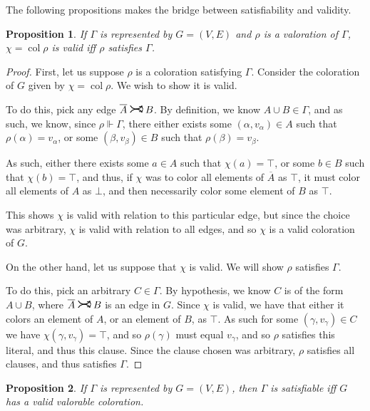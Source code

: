 \documentclass[11pt]{article}
\newcommand{\conj}[1]{\overline{#1}}
\newcommand{\sat}{\Vdash}
\DeclareMathOperator{\col}{col}
\newcommand{\rightcurvearrow}{
\mathrel{
  \begin{tikzpicture}[scale=0.8]
    \draw[thick,->] (0,1ex) arc (30:150:-2ex);
    \draw[thick,->] (0,-1ex) arc (150:30:2ex);
  \end{tikzpicture}
}
}
\newtheorem{prop}{Proposition}
\begin{document}
The following propositions makes the bridge between satisfiability and validity.

\begin{prop}
If $\Gamma$ is represented by $G = (V,E)$ and $\rho$ is a valoration of $\Gamma$, $\chi = \col \rho$ is valid iff $\rho$ satisfies $\Gamma$.
\end{prop}

\begin{proof}
First, let us suppose $\rho$ is a coloration satisfying $\Gamma$. Consider the coloration of $G$ given by $\chi = \col \rho$. We wish to show it is valid.

To do this, pick any edge $\conj A \rightcurvearrow B$. By definition, we know $A \cup B \in \Gamma$, and as such, we know, since $\rho \sat \Gamma$, there either exists some $(\alpha, v_\alpha) \in A$ such that $\rho(\alpha) = v_\alpha$, or some $(\beta, v_\beta) \in B$ such that $\rho(\beta) = v_\beta$.

As such, either there exists some $a \in A$ such that $\chi(a) = \top$, or some $b \in B$ such that $\chi(b) = \top$, and thus, if $\chi$ was to color all elements of $\conj A$ as $\top$, it must color all elements of $A$ as $\bot$, and then necessarily color some element of $B$ as $\top$.

This shows $\chi$ is valid with relation to this particular edge, but since the choice was arbitrary, $\chi$ is valid with relation to all edges, and so $\chi$ is a valid coloration of $G$.

On the other hand, let us suppose that $\chi$ is valid. We will show $\rho$ satisfies $\Gamma$.

To do this, pick an arbitrary $C \in \Gamma$. By hypothesis, we know $C$ is of the form $A \cup B$, where $\conj A \rightcurvearrow B$ is an edge in $G$. Since $\chi$ is valid, we have that either it colors an element of $A$, or an element of $B$, as $\top$. As such for some $(\gamma, v_\gamma) \in C$ we have $\chi(\gamma, v_\gamma) = \top$, and so $\rho(\gamma)$ must equal $v_\gamma$, and so $\rho$ satisfies this literal, and thus this clause. Since the clause chosen was arbitrary, $\rho$ satisfies all clauses, and thus satisfies $\Gamma$.
\end{proof}

\begin{prop}
If $\Gamma$ is represented by $G = (V,E)$, then $\Gamma$ is satisfiable iff $G$ has a valid valorable coloration.
\end{prop}
\end{document}
